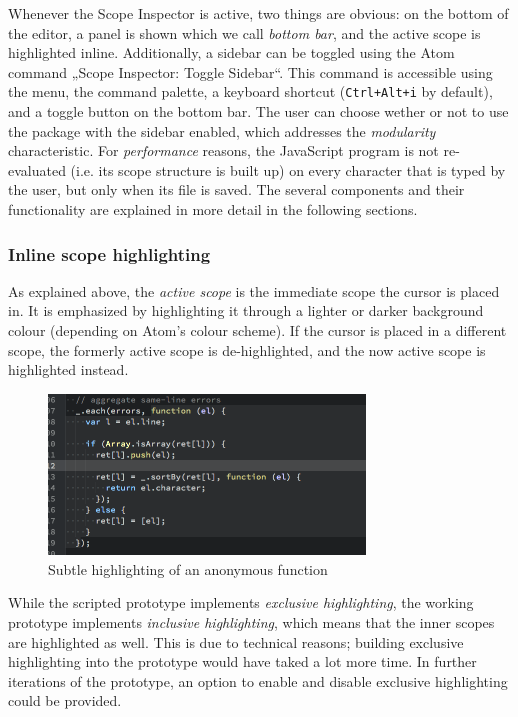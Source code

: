 Whenever the Scope Inspector is active, two things are obvious: on the
bottom of the editor, a panel is shown which we call \emph{bottom bar},
and the active scope is highlighted inline. Additionally, a sidebar can
be toggled using the Atom command „Scope Inspector: Toggle Sidebar“.
This command is accessible using the menu, the command palette, a
keyboard shortcut (\texttt{Ctrl+Alt+i} by default), and a toggle button
on the bottom bar. The user can choose wether or not to use the package
with the sidebar enabled, which addresses the \emph{modularity}
characteristic. For \emph{performance} reasons, the JavaScript program
is not re-evaluated (i.e. its scope structure is built up) on every
character that is typed by the user, but only when its file is saved.
The several components and their functionality are explained in more
detail in the following sections.

\subsubsection{Inline scope
highlighting}\label{inline-scope-highlighting}

As explained above, the \emph{active scope} is the immediate scope the
cursor is placed in. It is emphasized by highlighting it through a
lighter or darker background colour (depending on Atom’s colour scheme).
If the cursor is placed in a different scope, the formerly active scope
is de-highlighted, and the now active scope is highlighted instead.

\begin{figure}[htbp]
\centering
\includegraphics[keepaspectratio,width=0.75\textwidth]{img/scope-highlight.png}
\caption{Subtle highlighting of an anonymous function}
\label{fig:protohighlighting}
\end{figure}

While the scripted prototype implements \emph{exclusive highlighting},
the working prototype implements \emph{inclusive highlighting}, which
means that the inner scopes are highlighted as well. This is due to
technical reasons; building exclusive highlighting into the prototype
would have taked a lot more time. In further iterations of the
prototype, an option to enable and disable exclusive highlighting could
be provided.


